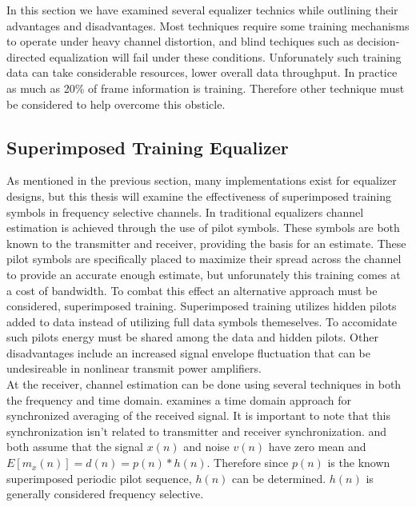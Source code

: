 \documentclass[11pt]{mvlthesis}
\begin{document}
In this section we have examined several equalizer technics while outlining their advantages and disadvantages.  Most techniques require some training mechanisms to operate under heavy channel distortion, and blind techiques such as decision-directed equalization will fail under these conditions.  Unforunately such training data can take considerable resources, lower overall data throughput.  In practice as much as 20\% of frame information is training.  Therefore other technique must be considered to help overcome this obsticle.\\


\subsection{Superimposed Training Equalizer}

As mentioned in the previous section, many implementations exist for equalizer designs, but this thesis will examine the effectiveness of superimposed training symbols in frequency selective channels.  In traditional equalizers channel estimation is achieved through the use of pilot symbols.  These symbols are both known to the transmitter and receiver, providing the basis for an estimate.  These pilot symbols are specifically placed to maximize their spread across the channel to provide an accurate enough estimate, but unforunately this training comes at a cost of bandwidth\cite{16}.  To combat this effect an alternative approach must be considered, superimposed training.  Superimposed training utilizes hidden pilots added to data instead of utilizing full data symbols themeselves.  To accomidate such pilots energy must be shared among the data and hidden pilots\cite{15}.  Other disadvantages include an increased signal envelope fluctuation that can be undesireable in nonlinear transmit power amplifiers\cite{17}.\\  

At the receiver, channel estimation can be done using several techniques in both the frequency and time domain.  \cite{17} examines a time domain approach for synchronized averaging of the received signal.  It is important to note that this synchronization isn't related to transmitter and receiver synchronization.  \cite{17} and \cite{18} both assume that the signal \( x(n)\) and noise \( v(n) \) have zero mean and \(E[m_{x}(n)] = d(n) = p(n) \ast h(n)\).  Therefore since \(p(n) \) is the known superimposed periodic pilot sequence, \(h(n)\) can be determined.  \(h(n)\) is generally considered frequency selective.\\
\end{document}
